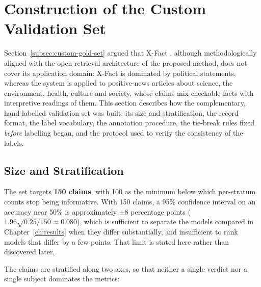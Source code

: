 
\section{Construction of the Custom Validation Set}
\label{sec:custom-dataset}

Section~\ref{subsec:custom-gold-set} argued that X-Fact
\cite{gupta2021xfact}, although methodologically aligned with the
open-retrieval architecture of the proposed method, does not cover
its application domain: X-Fact is dominated by political statements,
whereas the system is applied to positive-news articles about
science, the environment, health, culture and society, whose claims
mix checkable facts with interpretive readings of them. This section
describes how the complementary, hand-labelled validation set was
built: its size and stratification, the record format, the label
vocabulary, the annotation procedure, the tie-break rules fixed
\emph{before} labelling began, and the protocol used to verify the
consistency of the labels.

\subsection{Size and Stratification}
\label{subsec:custom-size}

The set targets \textbf{150 claims}, with 100 as the minimum below
which per-stratum counts stop being informative. With 150 claims, a
95\% confidence interval on an accuracy near 50\% is approximately
$\pm 8$ percentage points ($1.96\sqrt{0.25/150}\approx0.080$), which
is sufficient to separate the models compared in
Chapter~\ref{ch:results} when they differ substantially, and
insufficient to rank models that differ by a few points. That limit
is stated here rather than discovered later.

The claims are stratified along two axes, so that neither a single
verdict nor a single subject dominates the metrics:

